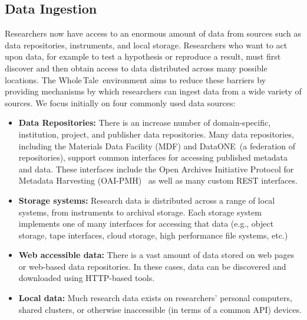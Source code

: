 \documentclass[review]{elsarticle}
\newcommand{\wt}{Whole\,Tale}
\begin{document}
\subsection{Data Ingestion}
\label{sec:data_ingestion}
Researchers now have access to an enormous amount of data from 
sources such as data repositories, instruments, and local storage. 
Researchers who want to act upon data, for example to test a hypothesis
or reproduce a result, must first discover and then obtain access to
data distributed across many possible locations. The \wt\ environment aims to 
reduce these barriers by providing mechanisms by which researchers
can ingest data from a wide variety of sources. We focus initially
on four commonly used data sources: 

\begin{itemize}
	\item \textbf{Data Repositories:} 
    There is an increase number of domain-specific, institution, project, and publisher data repositories. 
    Many data repositories, including the Materials Data Facility (MDF) and DataONE~\cite{michener15dataone}(a federation of repositories), support common interfaces for accessing published metadata and data.
    These interfaces include the 
    Open Archives Initiative Protocol for Metadata Harvesting (OAI-PMH)~\cite{oaipmh}
    as well as many custom REST interfaces.

    \item \textbf{Storage systems:} Research data is distributed across a range
    of local systems, from instruments to archival storage. Each storage system
    implements one of many interfaces for accessing that data (e.g., object storage,
    tape interfaces, cloud storage, high performance file systems, etc.)  
    
    \item \textbf{Web accessible data:} There is a vast amount of data stored
    on web pages or web-based data repositories. In these cases, data can be discovered and downloaded using HTTP-based tools.

    \item \textbf{Local data:} Much research data exists on researchers' personal
    computers, shared clusters, or otherwise inaccessible (in terms of a common API) devices. 
\end{itemize}
\end{document}
